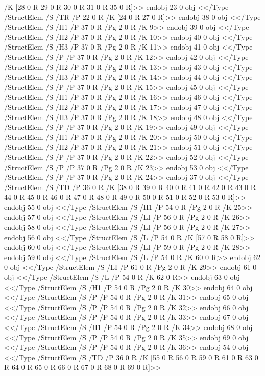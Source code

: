 \documentclass[
  letterpaper,
  DIV=11,
  numbers=noendperiod]{scrartcl}
\begin{document}
{{{{{{{{{{{{{{/K [28 0 R 29 0 R 30 0 R 31 0 R 35 0 R]>>
endobj
23 0 obj
<</Type /StructElem
/S /TR
/P 22 0 R
/K [24 0 R 27 0 R]>>
endobj
38 0 obj
<</Type /StructElem
/S /H1
/P 37 0 R
/Pg 2 0 R
/K 9>>
endobj
39 0 obj
<</Type /StructElem
/S /H2
/P 37 0 R
/Pg 2 0 R
/K 10>>
endobj
40 0 obj
<</Type /StructElem
/S /H3
/P 37 0 R
/Pg 2 0 R
/K 11>>
endobj
41 0 obj
<</Type /StructElem
/S /P
/P 37 0 R
/Pg 2 0 R
/K 12>>
endobj
42 0 obj
<</Type /StructElem
/S /H2
/P 37 0 R
/Pg 2 0 R
/K 13>>
endobj
43 0 obj
<</Type /StructElem
/S /H3
/P 37 0 R
/Pg 2 0 R
/K 14>>
endobj
44 0 obj
<</Type /StructElem
/S /P
/P 37 0 R
/Pg 2 0 R
/K 15>>
endobj
45 0 obj
<</Type /StructElem
/S /H1
/P 37 0 R
/Pg 2 0 R
/K 16>>
endobj
46 0 obj
<</Type /StructElem
/S /H2
/P 37 0 R
/Pg 2 0 R
/K 17>>
endobj
47 0 obj
<</Type /StructElem
/S /H3
/P 37 0 R
/Pg 2 0 R
/K 18>>
endobj
48 0 obj
<</Type /StructElem
/S /P
/P 37 0 R
/Pg 2 0 R
/K 19>>
endobj
49 0 obj
<</Type /StructElem
/S /H1
/P 37 0 R
/Pg 2 0 R
/K 20>>
endobj
50 0 obj
<</Type /StructElem
/S /H2
/P 37 0 R
/Pg 2 0 R
/K 21>>
endobj
51 0 obj
<</Type /StructElem
/S /P
/P 37 0 R
/Pg 2 0 R
/K 22>>
endobj
52 0 obj
<</Type /StructElem
/S /P
/P 37 0 R
/Pg 2 0 R
/K 23>>
endobj
53 0 obj
<</Type /StructElem
/S /P
/P 37 0 R
/Pg 2 0 R
/K 24>>
endobj
37 0 obj
<</Type /StructElem
/S /TD
/P 36 0 R
/K [38 0 R 39 0 R 40 0 R 41 0 R 42 0 R 43 0 R 44 0 R 45 0 R 46 0 R 47 0 R 48 0 R 49 0 R 50 0 R 51 0 R 52 0 R 53 0 R]>>
endobj
55 0 obj
<</Type /StructElem
/S /H1
/P 54 0 R
/Pg 2 0 R
/K 25>>
endobj
57 0 obj
<</Type /StructElem
/S /LI
/P 56 0 R
/Pg 2 0 R
/K 26>>
endobj
58 0 obj
<</Type /StructElem
/S /LI
/P 56 0 R
/Pg 2 0 R
/K 27>>
endobj
56 0 obj
<</Type /StructElem
/S /L
/P 54 0 R
/K [57 0 R 58 0 R]>>
endobj
60 0 obj
<</Type /StructElem
/S /LI
/P 59 0 R
/Pg 2 0 R
/K 28>>
endobj
59 0 obj
<</Type /StructElem
/S /L
/P 54 0 R
/K 60 0 R>>
endobj
62 0 obj
<</Type /StructElem
/S /LI
/P 61 0 R
/Pg 2 0 R
/K 29>>
endobj
61 0 obj
<</Type /StructElem
/S /L
/P 54 0 R
/K 62 0 R>>
endobj
63 0 obj
<</Type /StructElem
/S /H1
/P 54 0 R
/Pg 2 0 R
/K 30>>
endobj
64 0 obj
<</Type /StructElem
/S /P
/P 54 0 R
/Pg 2 0 R
/K 31>>
endobj
65 0 obj
<</Type /StructElem
/S /P
/P 54 0 R
/Pg 2 0 R
/K 32>>
endobj
66 0 obj
<</Type /StructElem
/S /P
/P 54 0 R
/Pg 2 0 R
/K 33>>
endobj
67 0 obj
<</Type /StructElem
/S /H1
/P 54 0 R
/Pg 2 0 R
/K 34>>
endobj
68 0 obj
<</Type /StructElem
/S /P
/P 54 0 R
/Pg 2 0 R
/K 35>>
endobj
69 0 obj
<</Type /StructElem
/S /P
/P 54 0 R
/Pg 2 0 R
/K 36>>
endobj
54 0 obj
<</Type /StructElem
/S /TD
/P 36 0 R
/K [55 0 R 56 0 R 59 0 R 61 0 R 63 0 R 64 0 R 65 0 R 66 0 R 67 0 R 68 0 R 69 0 R]>>
}}}}}}}}}}}}}}
\end{document}
